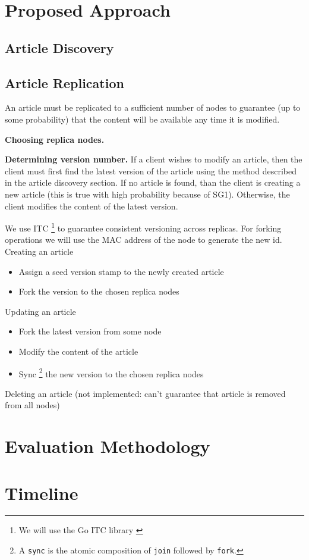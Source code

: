 \documentclass{article}
\begin{document}
\section{Proposed Approach}
\subsection{Article Discovery}

\subsection{Article Replication}
An article must be replicated to a sufficient number of nodes to guarantee (up to
some probability) that the content will be available any time it is modified.

\textbf{Choosing replica nodes.}

\textbf{Determining version number.} If a client wishes to modify an article,
then the client must first find the latest version of the article using the method
described in the article discovery section. If no article is found, than the client
is creating a new article (this is true with high probability because of SG1).
Otherwise, the client modifies the content of the latest version.

We use ITC \footnote{We will use the Go ITC library \cite{itclib}} to guarantee
consistent versioning across replicas. For forking operations we will use the MAC
address of the node to generate the new id.  \\

\noindent
Creating an article
\begin{itemize}[label={}]
  \item Assign a seed version stamp to the newly created article
  \item Fork the version to the chosen replica nodes
\end{itemize}

\noindent
Updating an article
\begin{itemize}[label={}]
  \item Fork the latest version from some node
  \item Modify the content of the article
  \item Sync \footnote{A \texttt{sync} is the atomic composition of \texttt{join}
  followed by \texttt{fork}.} the new version to the chosen replica nodes
\end{itemize}

\noindent
Deleting an article (not implemented: can't guarantee that article is removed
from all nodes)

\section{Evaluation Methodology}


\section{Timeline}




\end{document}

